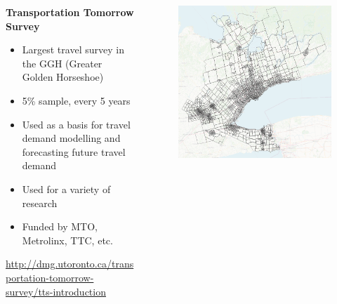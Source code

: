 \documentclass[aspectratio=169]{beamer}
\begin{document}
\begin{frame}
	
		\begin{columns}
		\begin{column}{0.5\textwidth}
			\textbf{Transportation Tomorrow Survey}
			\begin{itemize}
				\item Largest travel survey in the GGH (Greater Golden Horseshoe)
				\item 5\% sample, every 5 years
				\item Used as a basis for travel demand modelling and forecasting future travel demand
				\item Used for a variety of research
				\item Funded by MTO, Metrolinx, TTC, etc.
			\end{itemize}
		
		\tiny\url{http://dmg.utoronto.ca/transportation-tomorrow-survey/tts-introduction}
			
		\end{column}
		
		\begin{column}{0.5\textwidth}
			
			\begin{figure}
				\centering
				\includegraphics[width=1\linewidth]{images/tts_region.png}
			\end{figure}
			
			
		\end{column}
		
	\end{columns}
	
\end{frame}
\end{document}
